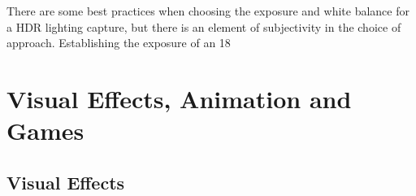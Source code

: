 There are some best practices when choosing the exposure and white balance for a HDR lighting capture, but there is an element of subjectivity in the choice of approach. Establishing the exposure of an 18%

\section{Visual Effects, Animation and Games}

\subsection{Visual Effects}



